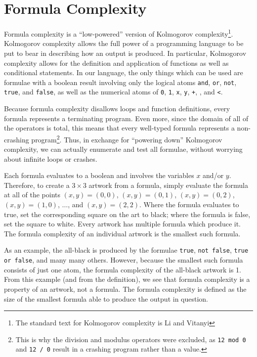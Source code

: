
\section{Formula Complexity}
\label{sec:formula}

Formula complexity is a ``low-powered'' version of Kolmogorov complexity\footnote{The standard text for Kolmogorov complexity is Li and Vitanyi\cite{Li}}.  Kolmogorov complexity
allows the full power of a programming language to be put to bear in describing
how an output is produced.  In particular, Kolmogorov complexity allows for the definition and
application of functions as well as conditional statements.  In our language,
the only things which can be used are formulae with a boolean result
involving only the logical atoms {\tt and}, {\tt or}, {\tt not}, {\tt true},
and {\tt false}, as well as the numerical atoms of {\tt 0}, {\tt 1}, {\tt x},
{\tt y}, {\tt +}, {\tt *}, and {\tt <}.

Because formula complexity disallows loops and function definitions, every
formula represents a terminating program.  Even more, since the domain of all
of the operators is total, this means that every well-typed formula represents
a non-crashing program\footnote{This is why the division and modulus operators
were excluded, as {\tt 12 mod 0} and {\tt 12 / 0} result in a crashing program
rather than a value.}.  Thus, in exchange for ``powering down'' Kolmogorov complexity, we can
actually enumerate and test all formulae, without worrying about infinite loops
or crashes.

Each formula evaluates to a boolean and involves the variables $x$ and/or $y$.
Therefore, to create a $3\times3$ artwork from a formula, simply evaluate the formula
at all of the points $(x,y) = (0,0)$, $(x,y) = (0,1)$, $(x,y) = (0,2)$, $(x,y)
= (1,0)$, $\ldots$, and $(x,y) = (2,2)$.  Where the formula evaluates to true,
set the corresponding square on the art to black; where the formula is
false, set the square to white.  Every artwork has multiple formula which
produce it.  The formula complexity of an individual artwork is the smallest
such formula.

As an example, the all-black is produced by the formulae {\tt true}, {\tt not
false}, {\tt true or false}, and many many others.  However, because the
smallest such formula consists of just one atom, the formula complexity of the
all-black artwork is 1.  From this example (and from the definition), we see
that formula complexity is a property of an artwork, not a formula.  The
formula complexity is defined as the size of the smallest formula able to
produce the output in question. 

